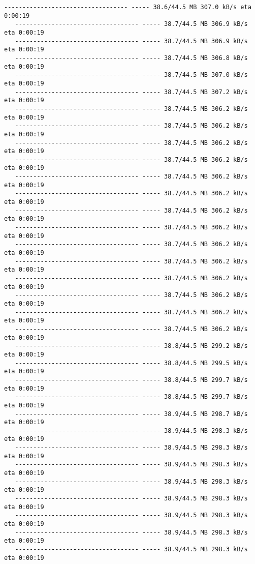 \documentclass[11pt]{article}
\begin{document}
\begin{Verbatim}[commandchars=\\\{\}]
   ---------------------------------- ----- 38.6/44.5 MB 307.0 kB/s eta 0:00:19
   ---------------------------------- ----- 38.7/44.5 MB 306.9 kB/s eta 0:00:19
   ---------------------------------- ----- 38.7/44.5 MB 306.9 kB/s eta 0:00:19
   ---------------------------------- ----- 38.7/44.5 MB 306.8 kB/s eta 0:00:19
   ---------------------------------- ----- 38.7/44.5 MB 307.0 kB/s eta 0:00:19
   ---------------------------------- ----- 38.7/44.5 MB 307.2 kB/s eta 0:00:19
   ---------------------------------- ----- 38.7/44.5 MB 306.2 kB/s eta 0:00:19
   ---------------------------------- ----- 38.7/44.5 MB 306.2 kB/s eta 0:00:19
   ---------------------------------- ----- 38.7/44.5 MB 306.2 kB/s eta 0:00:19
   ---------------------------------- ----- 38.7/44.5 MB 306.2 kB/s eta 0:00:19
   ---------------------------------- ----- 38.7/44.5 MB 306.2 kB/s eta 0:00:19
   ---------------------------------- ----- 38.7/44.5 MB 306.2 kB/s eta 0:00:19
   ---------------------------------- ----- 38.7/44.5 MB 306.2 kB/s eta 0:00:19
   ---------------------------------- ----- 38.7/44.5 MB 306.2 kB/s eta 0:00:19
   ---------------------------------- ----- 38.7/44.5 MB 306.2 kB/s eta 0:00:19
   ---------------------------------- ----- 38.7/44.5 MB 306.2 kB/s eta 0:00:19
   ---------------------------------- ----- 38.7/44.5 MB 306.2 kB/s eta 0:00:19
   ---------------------------------- ----- 38.7/44.5 MB 306.2 kB/s eta 0:00:19
   ---------------------------------- ----- 38.7/44.5 MB 306.2 kB/s eta 0:00:19
   ---------------------------------- ----- 38.7/44.5 MB 306.2 kB/s eta 0:00:19
   ---------------------------------- ----- 38.8/44.5 MB 299.2 kB/s eta 0:00:19
   ---------------------------------- ----- 38.8/44.5 MB 299.5 kB/s eta 0:00:19
   ---------------------------------- ----- 38.8/44.5 MB 299.7 kB/s eta 0:00:19
   ---------------------------------- ----- 38.8/44.5 MB 299.7 kB/s eta 0:00:19
   ---------------------------------- ----- 38.9/44.5 MB 298.7 kB/s eta 0:00:19
   ---------------------------------- ----- 38.9/44.5 MB 298.3 kB/s eta 0:00:19
   ---------------------------------- ----- 38.9/44.5 MB 298.3 kB/s eta 0:00:19
   ---------------------------------- ----- 38.9/44.5 MB 298.3 kB/s eta 0:00:19
   ---------------------------------- ----- 38.9/44.5 MB 298.3 kB/s eta 0:00:19
   ---------------------------------- ----- 38.9/44.5 MB 298.3 kB/s eta 0:00:19
   ---------------------------------- ----- 38.9/44.5 MB 298.3 kB/s eta 0:00:19
   ---------------------------------- ----- 38.9/44.5 MB 298.3 kB/s eta 0:00:19
   ---------------------------------- ----- 38.9/44.5 MB 298.3 kB/s eta 0:00:19

\end{Verbatim}
\end{document}
